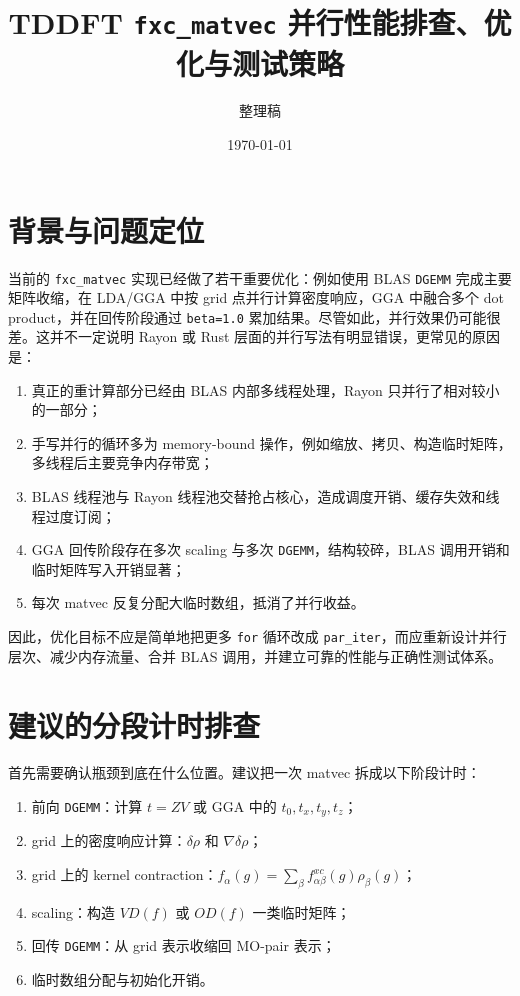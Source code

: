 \documentclass[11pt,a4paper]{ctexart}
\title{TDDFT \texttt{fxc\_matvec} 并行性能排查、优化与测试策略}
\author{整理稿}
\date{\today}
\begin{document}
\maketitle

\section{背景与问题定位}

当前的 \texttt{fxc\_matvec} 实现已经做了若干重要优化：例如使用 BLAS \texttt{DGEMM} 完成主要矩阵收缩，在 LDA/GGA 中按 grid 点并行计算密度响应，GGA 中融合多个 dot product，并在回传阶段通过 \texttt{beta=1.0} 累加结果。尽管如此，并行效果仍可能很差。这并不一定说明 Rayon 或 Rust 层面的并行写法有明显错误，更常见的原因是：

\begin{enumerate}[leftmargin=2em]
  \item 真正的重计算部分已经由 BLAS 内部多线程处理，Rayon 只并行了相对较小的一部分；
  \item 手写并行的循环多为 memory-bound 操作，例如缩放、拷贝、构造临时矩阵，多线程后主要竞争内存带宽；
  \item BLAS 线程池与 Rayon 线程池交替抢占核心，造成调度开销、缓存失效和线程过度订阅；
  \item GGA 回传阶段存在多次 scaling 与多次 \texttt{DGEMM}，结构较碎，BLAS 调用开销和临时矩阵写入开销显著；
  \item 每次 matvec 反复分配大临时数组，抵消了并行收益。
\end{enumerate}

因此，优化目标不应是简单地把更多 \texttt{for} 循环改成 \texttt{par\_iter}，而应重新设计并行层次、减少内存流量、合并 BLAS 调用，并建立可靠的性能与正确性测试体系。

\section{建议的分段计时排查}

首先需要确认瓶颈到底在什么位置。建议把一次 matvec 拆成以下阶段计时：

\begin{enumerate}[leftmargin=2em]
  \item 前向 \texttt{DGEMM}：计算 $t = Z V$ 或 GGA 中的 $t_0,t_x,t_y,t_z$；
  \item grid 上的密度响应计算：$\delta\rho$ 和 $\nabla\delta\rho$；
  \item grid 上的 kernel contraction：$f_{\alpha}(g)=\sum_\beta f_{\alpha\beta}^{xc}(g)\rho_\beta(g)$；
  \item scaling：构造 $V D(f)$ 或 $O D(f)$ 一类临时矩阵；
  \item 回传 \texttt{DGEMM}：从 grid 表示收缩回 MO-pair 表示；
  \item 临时数组分配与初始化开销。
\end{enumerate}
\end{document}
